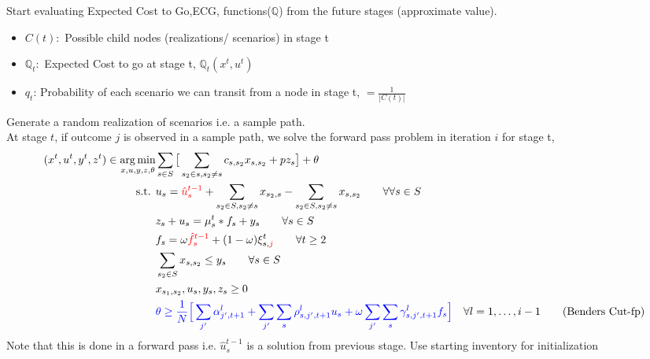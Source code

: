 \documentclass[11pt,letterpaper]{article}
\newcommand{\Q}{\mathbb{Q}}
\DeclareMathOperator*{\argmin}{arg\,min}
\begin{document}
Start evaluating Expected Cost to Go,ECG, functions($\Q$) from the future stages (approximate value). 
\begin{itemize}
    \item $C(t):$ Possible child nodes (realizations/ scenarios) in stage t
    \item $\Q_t:$ Expected Cost to go at stage t, $\Q_t(x^t,u^t)$
    \item $q_t$: Probability of each scenario we can transit from a node in stage t, $=\frac{1}{|C(t)|}$
\end{itemize}
Generate a random realization of scenarios i.e. a sample path. \\
At stage $t$, if outcome $j$ is observed in a sample path, we solve the forward pass problem in iteration $i$ for stage t,
\begin{align}
    (x^t,u^t,y^t,z^t) \in \argmin_{x,u,y,z,\theta} & \sum_{s\in S}\big[\sum_{s_2 \in s, s_2\neq s} c_{s,s_2}x_{s,s_2}+pz_{s}\big]+\theta\\
    \text{s.t. } & u_s=\textcolor{red}{{\hat{u}}_s^{t-1}}+\sum_{s_2\in S,s_2\neq s}x_{s_2,s}-\sum_{s_2\in S, s_2\neq s}x_{s,s_2} \qquad \forall \forall s \in S\\
    & z_s+u_s=\mu^{t}_{s}*f_s+y_s \qquad \forall s \in S\\
    &f_s=\omega \textcolor{red}{\hat{f}^{t-1}_s}+(1-\omega)\xi^t_{s,\textcolor{red}{j}} \qquad \forall t\ge 2\\
    & \sum_{s_2\in S}x_{s,s_2}\le y_{s} \qquad \forall s \in S\\
    & x_{s_1,s_2}, u_s,y_s,z_s\ge 0 \\
    & \textcolor{blue}{\theta\ge \frac1N \Big[\sum_{j'}\alpha^l_{j',t+1}+\sum_{j'}\sum_s\rho^l_{s,j',t+1}{u}_s +\omega\sum_{j'}\sum_s\gamma^l_{s,j',t+1}{f}_s \Big]} \quad \forall l=1,\dots,i-1 \tag{Benders Cut-fp}
\end{align}
Note that this is done in a forward pass i.e. ${\hat{u}}_s^{t-1}$ is a solution from previous stage. Use starting inventory for initialization
\end{document}
